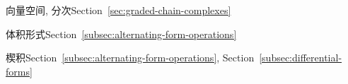 \par\noindent\hspace*{0em}\label{index:vector-space-graded}{向量空间, 分次}\quad Section~\ref{sec:graded-chain-complexes}

\par\noindent\hspace*{0em}\label{index:volume-form}{体积形式}\quad Section~\ref{subsec:alternating-form-operations}

\par\noindent\hspace*{0em}\label{index:wedge-product}{楔积}\quad Section~\ref{subsec:alternating-form-operations}, Section~\ref{subsec:differential-forms}
\par\endgroup
